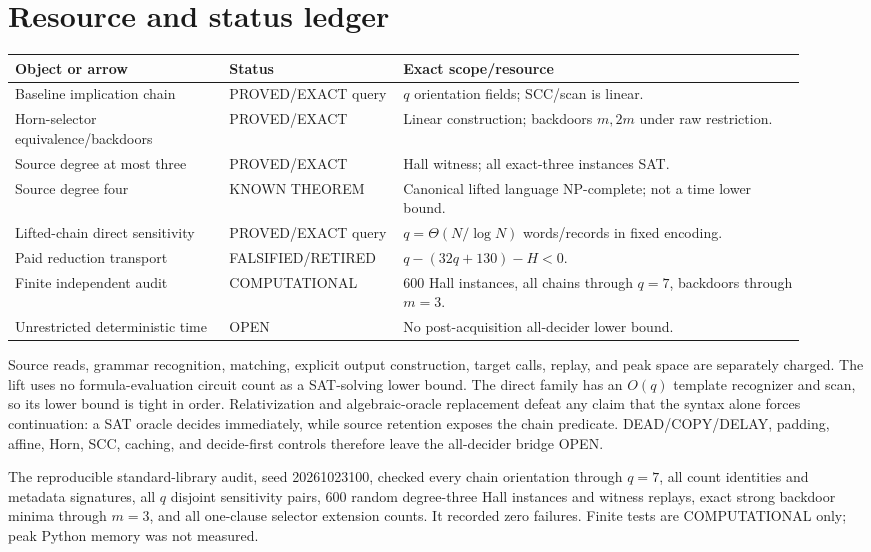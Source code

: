 \documentclass[11pt]{article}
\begin{document}
\section{Resource and status ledger}
\begin{center}\small
\begin{tabular}{p{0.25\linewidth}p{0.2\linewidth}p{0.47\linewidth}}
\toprule
Object or arrow & Status & Exact scope/resource\\
\midrule
Baseline implication chain & PROVED/EXACT query & $q$ orientation fields; SCC/scan is linear.\\
Horn-selector equivalence/backdoors & PROVED/EXACT & Linear construction; backdoors $m,2m$ under raw restriction.\\
Source degree at most three & PROVED/EXACT & Hall witness; all exact-three instances SAT.\\
Source degree four & KNOWN THEOREM & Canonical lifted language NP-complete; not a time lower bound.\\
Lifted-chain direct sensitivity & PROVED/EXACT query & $q=\Theta(N/\log N)$ words/records in fixed encoding.\\
Paid reduction transport & FALSIFIED/RETIRED & $q-(32q+130)-H<0$.\\
Finite independent audit & COMPUTATIONAL & 600 Hall instances, all chains through $q=7$, backdoors through $m=3$.\\
Unrestricted deterministic time & OPEN & No post-acquisition all-decider lower bound.\\
\bottomrule
\end{tabular}
\end{center}

Source reads, grammar recognition, matching, explicit output construction, target calls, replay, and peak space are separately charged.  The lift uses no formula-evaluation circuit count as a SAT-solving lower bound.  The direct family has an $O(q)$ template recognizer and scan, so its lower bound is tight in order.  Relativization and algebraic-oracle replacement defeat any claim that the syntax alone forces continuation: a SAT oracle decides immediately, while source retention exposes the chain predicate.  DEAD/COPY/DELAY, padding, affine, Horn, SCC, caching, and decide-first controls therefore leave the all-decider bridge OPEN.

The reproducible standard-library audit, seed 20261023100, checked every chain orientation through $q=7$, all count identities and metadata signatures, all $q$ disjoint sensitivity pairs, 600 random degree-three Hall instances and witness replays, exact strong backdoor minima through $m=3$, and all one-clause selector extension counts.  It recorded zero failures.  Finite tests are COMPUTATIONAL only; peak Python memory was not measured.
\end{document}
